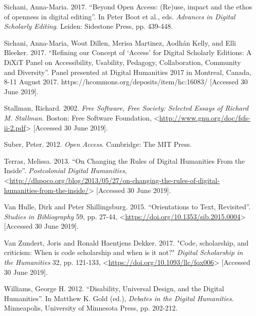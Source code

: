 \begin{paper}
\begin{flushleft}
Sichani, Anna-Maria. 2017. ``Beyond Open Access: (Re)use, impact and the
ethos of openness in digital editing''. In Peter Boot et al., eds.
\emph{Advances in Digital Scholarly Editing}. Leiden: Sidestone Press,
pp. 439-448.

Sichani, Anna-Maria, Wout Dillen, Merisa Martinez, Aodhán Kelly, and
Elli Bleeker. 2017. ``Refining our Concept of `Access' for Digital
Scholarly Editions: A DiXiT Panel on Accessibility, Usability, Pedagogy,
Collaboration, Community and Diversity''. Panel presented at Digital
Humanities 2017 in Montreal, Canada, 8-11 August 2017.
https://hcommons.org/deposits/item/hc:16083/ {[}Accessed 30 June 2019{]}.

Stallman, Richard. 2002. \emph{Free Software, Free Society: Selected
Essays of Richard M. Stallman.} Boston: Free Software Foundation,
\textless{}\href{http://www.gnu.org/doc/fsfs-ii-2.pdf}{http://www.gnu.org/doc/fsfs-ii-2.pdf}\textgreater{}
{[}Accessed 30 June 2019{]}.

Suber, Peter. 2012. \emph{Open Access}. Cambridge: The MIT Press.

Terras, Melissa. 2013. ``On Changing the Rules of Digital Humanities
From the Inside''. \emph{Postcolonial Digital Humanities},
\textless{}\href{http://dhpoco.org/blog/2013/05/27/on-changing-the-rules-of-digital-humanities-from-the-inside/}{http://dhpoco.org/blog/2013/05/27/on-changing-the-rules-of-digital-humanities-from-the-inside/}\textgreater{}
{[}Accessed 30 June 2019{]}.

Van Hulle, Dirk and Peter Shillingsburg. 2015. ``Orientations to Text,
Revisited''. \emph{Studies in Bibliography} 59, pp. 27-44,
\textless{}\href{https://doi.org/10.1353/sib.2015.0004}{https://doi.org/10.1353/sib.2015.0004}\textgreater{}
{[}Accessed 30 June 2019{]}.

Van Zundert, Joris and Ronald Haentjens Dekker. 2017. "Code,
scholarship, and criticism: When is code scholarship and when is it
not?" \emph{Digital Scholarship in the Humanities} 32, pp. 121-133,
\textless{}\href{https://doi.org/10.1093/llc/fqx006}{https://doi.org/10.1093/llc/fqx006}\textgreater{} {[}Accessed
30 June 2019{]}.

Williams, George H. 2012. ``Disability, Universal Design, and the
Digital Humanities''. In Matthew K. Gold (ed.), \emph{Debates in the
Digital Humanities}. Minneapolis, University of Minnesota Press, pp.
202-212.
\end{flushleft}
\renewcommand{\thesubsection}{\thesection.\arabic{subsection}}  
\end{paper}
